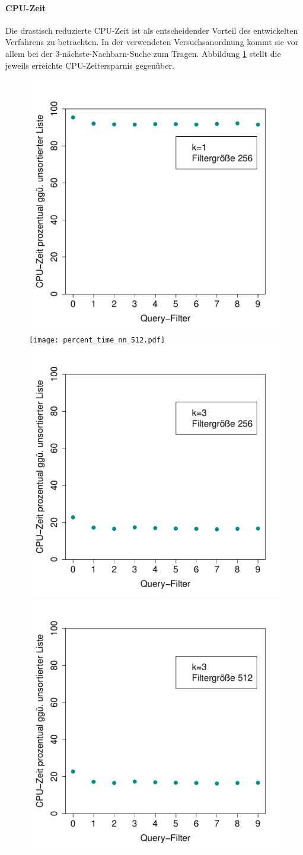 \paragraph*{CPU-Zeit}
Die drastisch reduzierte CPU-Zeit ist als entscheidender Vorteil des entwickelten Verfahrens zu betrachten. In der verwendeten Versuchsanordnung kommt sie vor allem bei der 3-nächste-Nachbarn-Suche zum Tragen. Abbildung \ref{fig:zeitersparnis} stellt die jeweils erreichte CPU-Zeitersparnis gegenüber.
\begin{figure}[hpbt]
	\centering
	\label{fig:zeitersparnis}
	\includegraphics[width=0.48\linewidth]{pictures/percent_time_nn_256.pdf}
	\hspace{0.01\textwidth}
	\texttt{[image: percent\_time\_nn\_512.pdf]}\\[0pt] %
	\includegraphics[width=0.48\linewidth]{pictures/percent_time_nn3_256.pdf}
	\hspace{0.01\textwidth}
	\includegraphics[width=0.48\linewidth]{pictures/percent_time_nn3_512.pdf}
\end{figure}
